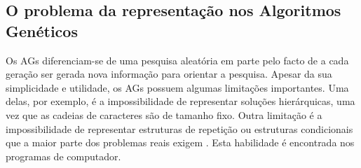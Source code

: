 \subsection{O problema da representação nos Algoritmos Genéticos}

Os \acp{AG} diferenciam-se de uma pesquisa aleatória em parte pelo facto de a cada geração ser gerada nova 
informação para orientar a pesquisa. Apesar da sua simplicidade e utilidade, os \acp{AG} possuem algumas limitações importantes. 
Uma delas, por exemplo, é a impossibilidade de representar soluções hierárquicas, uma vez que as cadeias de caracteres são de 
tamanho fixo. Outra limitação é a impossibilidade de representar estruturas de repetição ou estruturas condicionais que a maior parte dos 
problemas reais exigem \citep{DeJong1985, Koza1992}. Esta habilidade é encontrada nos programas de computador.